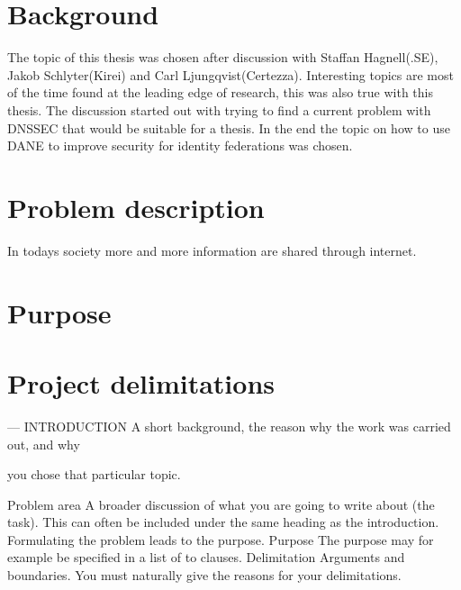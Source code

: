\section{Background}
The topic of this thesis was chosen after discussion with Staffan Hagnell(.SE), Jakob Schlyter(Kirei) and Carl Ljungqvist(Certezza).
Interesting topics are most of the time found at the leading edge of research, this was also true with this thesis.
The discussion started out with trying to find a current problem with DNSSEC that would be suitable for a thesis.
In the end the topic on how to use DANE to improve security for identity federations was chosen.

\section{Problem description}
In todays society more and more information are shared through internet.



\section{Purpose}
\section{Project delimitations}


---
INTRODUCTION A short background, the reason why the work was carried out, and why

you chose that particular topic.

 Problem area A broader discussion of what you are going to write about (the task). This
can often be included under the same heading as the introduction. Formulating the problem
leads to the purpose.
 Purpose  The purpose may for example be specified in a list of to clauses.
 Delimitation  Arguments and boundaries. You must naturally give the reasons for your
delimitations.

